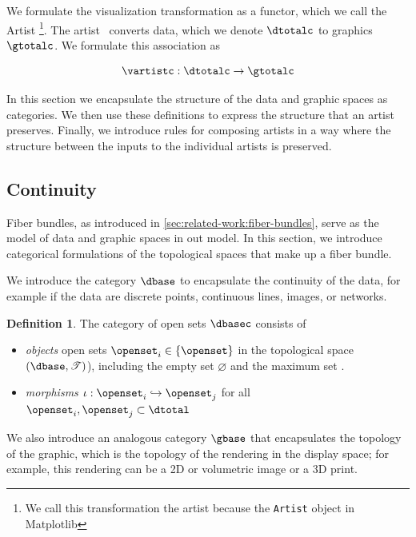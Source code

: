 \documentclass[10pt,journal,compsoc]{IEEEtran}
\theoremstyle{definition}
\newtheorem{definition}{Definition}[section]
\theoremstyle{remark}
\begin{document}
We formulate the visualization transformation as a functor, which we call the \textcolor{artist}{Artist} \vartist \footnote{We call this transformation the artist because the \texttt{Artist} object in Matplotlib\cite{hunterMatplotlib2DGraphics2007}}. The artist \vartist\ converts \textcolor{total}{data}, which we denote $\mathcal{\dtotalc}$ to \textcolor{total}{graphics} $\mathcal{\gtotalc}$. We formulate this association as 

\begin{equation}
  \label{eq:artist:artist}
  \vartistc: \mathcal{\dtotalc} \rightarrow \mathcal{\gtotalc}
\end{equation}

In this section we encapsulate the structure of the data and graphic spaces as categories. We then use these definitions to express the structure that an artist preserves. Finally, we introduce rules for composing artists in a way where the structure between the inputs to the individual artists is preserved. 


\subsection{Continuity}
\label{sec:artist:category}

Fiber bundles, as introduced in \autoref{sec:related-work:fiber-bundles}, serve as the model of data and graphic spaces in out model. In this section, we introduce categorical formulations of the topological spaces that make up a fiber bundle. 

We introduce the category $\mathcal{\dbase}$ to encapsulate the continuity of the data, for example if the data are discrete points, continuous lines, images, or networks. 
\begin{definition} \label{def:category:K} The category of open sets $\mathcal{\dbasec}$ consists of
  \begin{itemize}
    \item \textit{objects} open sets $\openset_{i} \in \{\openset\}$ in the topological space $(\dbase, \mathscr{T})$), including the empty set $\varnothing$ and the maximum set \dbase. 
    \item \textit{morphisms} $\iota: \openset_{i} \hookrightarrow \openset_{j}$ for all  $\openset_i, \openset_j \subset \dtotal$
  \end{itemize} 
\end{definition}

We also introduce an analogous category $\mathcal{\gbase}$ that encapsulates the topology of the graphic, which is the topology of the rendering in the display space; for example, this rendering can be a 2D or volumetric image or a 3D print. 
\end{document}
